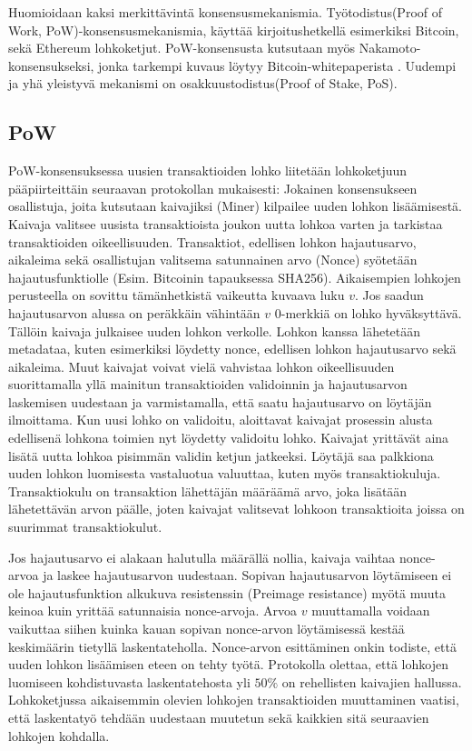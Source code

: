 Huomioidaan kaksi merkittävintä konsensusmekanismia. Työtodistus(Proof of Work, PoW)-konsensusmekanismia, käyttää kirjoitushetkellä esimerkiksi Bitcoin, sekä Ethereum lohkoketjut. PoW-konsensusta kutsutaan myös Nakamoto-konsensukseksi, jonka tarkempi kuvaus löytyy Bitcoin-whitepaperista \cite{Nakamoto_bitcoin}. Uudempi ja yhä yleistyvä mekanismi on  osakkuustodistus(Proof of Stake, PoS). 

\subsection{PoW}
PoW-konsensuksessa uusien transaktioiden lohko liitetään lohkoketjuun pääpiirteittäin seuraavan protokollan mukaisesti: Jokainen konsensukseen osallistuja, joita kutsutaan kaivajiksi (Miner) kilpailee uuden lohkon lisäämisestä. Kaivaja valitsee uusista transaktioista joukon uutta lohkoa varten ja tarkistaa transaktioiden oikeellisuuden. Transaktiot, edellisen lohkon hajautusarvo, aikaleima sekä osallistujan valitsema satunnainen arvo (Nonce) syötetään hajautusfunktiolle (Esim. Bitcoinin tapauksessa SHA256). Aikaisempien lohkojen perusteella on sovittu tämänhetkistä vaikeutta kuvaava luku $v$. Jos saadun hajautusarvon alussa on peräkkäin vähintään $v$ 0-merkkiä on lohko hyväksyttävä. Tällöin kaivaja julkaisee uuden lohkon verkolle. Lohkon kanssa lähetetään metadataa, kuten esimerkiksi löydetty nonce, edellisen lohkon hajautusarvo sekä aikaleima. Muut kaivajat voivat vielä vahvistaa lohkon oikeellisuuden suorittamalla yllä mainitun transaktioiden validoinnin ja hajautusarvon laskemisen uudestaan ja varmistamalla, että saatu hajautusarvo on löytäjän ilmoittama. Kun uusi lohko on validoitu, aloittavat kaivajat prosessin alusta edellisenä lohkona toimien nyt löydetty validoitu lohko. Kaivajat yrittävät aina lisätä uutta lohkoa pisimmän validin ketjun jatkeeksi. Löytäjä saa palkkiona uuden lohkon luomisesta vastaluotua valuuttaa, kuten myös transaktiokuluja. Transaktiokulu on transaktion lähettäjän määräämä arvo, joka lisätään lähetettävän arvon päälle, joten kaivajat valitsevat lohkoon transaktioita joissa on suurimmat transaktiokulut.

Jos hajautusarvo ei alakaan halutulla määrällä nollia, kaivaja vaihtaa nonce-arvoa ja laskee hajautusarvon uudestaan. Sopivan hajautusarvon löytämiseen ei ole hajautusfunktion alkukuva resistenssin (Preimage resistance) myötä muuta keinoa kuin yrittää satunnaisia nonce-arvoja. Arvoa $v$ muuttamalla voidaan vaikuttaa siihen kuinka kauan sopivan nonce-arvon löytämisessä kestää keskimäärin tietyllä laskentateholla. Nonce-arvon esittäminen onkin todiste, että uuden lohkon lisäämisen eteen on tehty työtä. Protokolla olettaa, että lohkojen luomiseen kohdistuvasta laskentatehosta yli $50\%$ on rehellisten kaivajien hallussa. Lohkoketjussa aikaisemmin olevien lohkojen transaktioiden muuttaminen vaatisi, että laskentatyö tehdään uudestaan muutetun sekä kaikkien sitä seuraavien lohkojen kohdalla.

